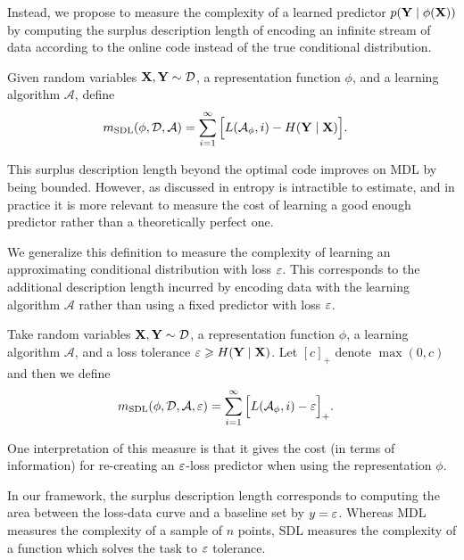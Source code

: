 Instead, we propose to measure the complexity of a learned predictor $p({\mathbf{Y}} \mid \phi({\mathbf{X}}))$ by computing the surplus description length of encoding an infinite stream of data according to the online code instead of the true conditional distribution.
\begin{definition} \label{def:sdl_entropy}
    Given random variables ${\mathbf{X}}, {\mathbf{Y}} \sim \mathcal{D}$, a representation function $ \phi$, and a learning algorithm $\mathcal{A}$, define
    \begin{align}
        m_{\mathrm{SDL}}(\phi, \mathcal{D}, \mathcal{A}) &=
        \sum_{i=1}^\infty \Big[ L(\mathcal{A}_\phi, i) - H({\mathbf{Y}} \mid {\mathbf{X}}) \Big].
    \end{align}
\end{definition}
This surplus description length beyond the optimal code improves on MDL by being bounded.
However, as discussed in  entropy is intractible to estimate, and in practice it is more relevant to measure the cost of learning a good enough predictor rather than a theoretically perfect one.

We generalize this definition to measure the complexity of learning an approximating conditional distribution with loss $\varepsilon$.
This corresponds to the additional description length incurred by encoding data with the learning algorithm $\mathcal{A}$ rather than using a fixed predictor with loss $\varepsilon$.
\begin{definition} \label{def:sdl}
    Take random variables ${\mathbf{X}}, {\mathbf{Y}} \sim \mathcal{D}$, a representation function $ \phi$, a learning algorithm $\mathcal{A}$, and a loss tolerance $\varepsilon \geqslant H({\mathbf{Y}} \mid {\mathbf{X}})$. Let $[c]_+$ denote $\max(0, c)$ and then we define
    \begin{align}
        m_{\mathrm{SDL}}(\phi, \mathcal{D}, \mathcal{A},\varepsilon) &= \sum_{i=1}^\infty \Big[ L(\mathcal{A}_\phi, i) - \varepsilon \Big]_+.
    \end{align}
\end{definition}
One interpretation of this measure is that it gives the cost (in terms of information) for re-creating an $\varepsilon$-loss predictor when using the representation $\phi$.

In our framework, the surplus description length corresponds to computing the area between the loss-data curve and a baseline set by $y = \varepsilon$.
Whereas MDL measures the complexity of a sample of $n$ points, SDL measures the complexity of a function which solves the task to $\varepsilon$ tolerance.

